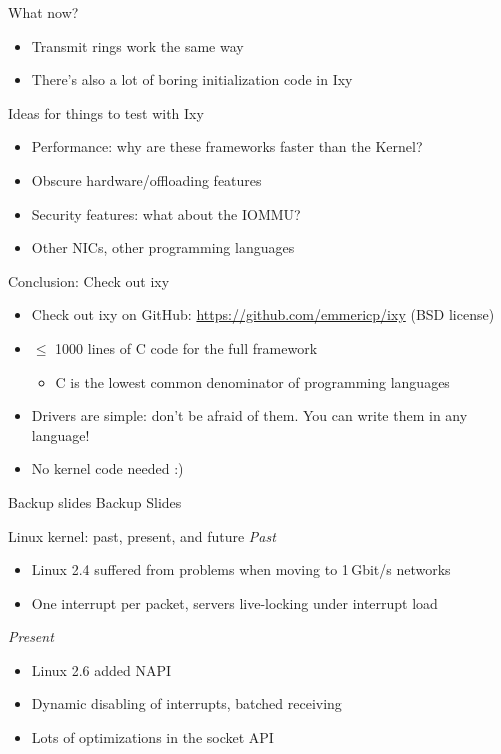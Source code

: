 \documentclass[NET,english,aspectratio=169]{tumbeamer}
\begin{document}
\begin{frame}{What now?}
\begin{itemize}
\item Transmit rings work the same way
\item There's also a lot of boring initialization code in Ixy
\end{itemize}
\pause
Ideas for things to test with Ixy
\begin{itemize}
\item Performance: why are these frameworks faster than the Kernel?
\item Obscure hardware/offloading features
\item Security features: what about the IOMMU?
\item Other NICs, other programming languages
\end{itemize}
\end{frame}


\begin{frame}{Conclusion: Check out ixy}
\centering {}
\begin{itemize}
\item Check out ixy on GitHub: \url{https://github.com/emmericp/ixy} (BSD license)
\item $\le$ 1000 lines of C code for the full framework
\begin{itemize}
	\item C is the lowest common denominator of programming languages
\end{itemize}
\item Drivers are simple: don't be afraid of them. You can write them in any language!
\item No kernel code needed :)
\end{itemize}
\end{frame}

\begin{frame}{Backup slides}
\vfill
\centering \huge Backup Slides
\vfill
\end{frame}

\begin{frame}{Linux kernel: past, present, and future}
\emph{Past}
\begin{itemize}
\item Linux 2.4 suffered from problems when moving to 1\,Gbit/s networks
\item One interrupt per packet, servers live-locking under interrupt load
\end{itemize}
\emph{Present}
\begin{itemize}
\item Linux 2.6 added NAPI
\item Dynamic disabling of interrupts, batched receiving
\item Lots of optimizations in the socket API
\end{itemize}
\end{frame}
\end{document}
